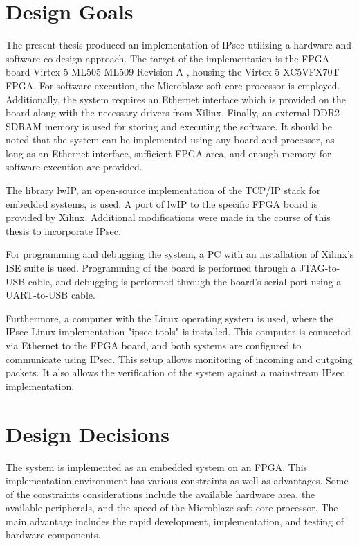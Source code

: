 
\section{Design Goals}
The present thesis produced an implementation of IPsec utilizing a hardware and software co-design approach. The target of the implementation is the FPGA board Virtex-5 ML505-ML509 Revision A \cite{ml505_user_guide}, housing the Virtex-5 XC5VFX70T FPGA. For software execution, the Microblaze soft-core processor \cite{mb_user_guide} is employed. Additionally, the system requires an Ethernet interface which is provided on the board along with the necessary drivers from Xilinx. Finally, an external DDR2 SDRAM memory is used for storing and executing the software. It should be noted that the system can be implemented using any board and processor, as long as an Ethernet interface, sufficient FPGA area, and enough memory for software execution are provided.

The library lwIP, an open-source implementation of the TCP/IP stack for embedded systems, is used. A port of lwIP to the specific FPGA board is provided by Xilinx. Additional modifications were made in the course of this thesis to incorporate IPsec.

For programming and debugging the system, a PC with an installation of Xilinx's ISE suite is used. Programming of the board is performed through a JTAG-to-USB cable, and debugging is performed through the board's serial port using a UART-to-USB cable.

Furthermore, a computer with the Linux operating system is used, where the IPsec Linux implementation "ipsec-tools" is installed. This computer is connected via Ethernet to the FPGA board, and both systems are configured to communicate using IPsec. This setup allows monitoring of incoming and outgoing packets. It also allows the verification of the system against a mainstream IPsec implementation.


\section{Design Decisions}

The system is implemented as an embedded system on an FPGA. This implementation environment has various constraints as well as advantages. Some of the constraints considerations include the available hardware area, the available peripherals, and the speed of the Microblaze soft-core processor. The main advantage includes the rapid development, implementation, and testing of hardware components.

